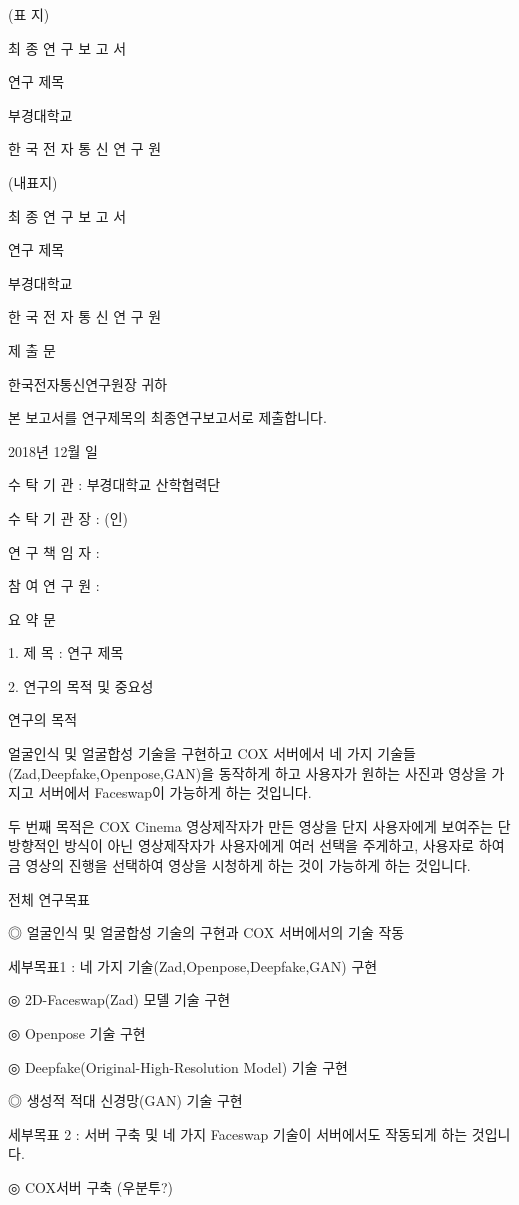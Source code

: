 \documentclass{oblivoir}
\begin{document}
(표  지)

최 종 연 구 보 고 서

연구 제목

부경대학교

한 국 전 자 통 신 연 구 원

(내표지)

최 종 연 구 보 고 서

연구 제목

부경대학교

한 국 전 자 통 신 연 구 원

제     출     문

한국전자통신연구원장  귀하

본 보고서를 연구제목의 최종연구보고서로 제출합니다. 

2018년 12월 일

수  탁  기  관 :  부경대학교 산학협력단

수 탁 기 관 장 :           (인)

연 구 책 임 자 :  

참 여 연 구 원 :  

  요     약     문

1. 제   목 : 연구 제목 

2. 연구의 목적 및 중요성

 연구의 목적

 얼굴인식 및 얼굴합성 기술을 구현하고 COX 서버에서 네 가지 기술들(Zad,Deepfake,Openpose,GAN)을 동작하게 하고 사용자가 원하는 사진과 영상을 가지고 서버에서 Faceswap이 가능하게 하는 것입니다. 

두 번째 목적은 COX Cinema 영상제작자가 만든 영상을 단지 사용자에게 보여주는 단방향적인 방식이 아닌 영상제작자가 사용자에게 여러 선택을 주게하고, 사용자로 하여금 영상의 진행을 선택하여 영상을 시청하게 하는 것이 가능하게 하는 것입니다. 

전체 연구목표

◎ 얼굴인식 및 얼굴합성 기술의 구현과 COX 서버에서의 기술 작동

 세부목표1 : 네 가지 기술(Zad,Openpose,Deepfake,GAN) 구현

◎ 2D-Faceswap(Zad) 모델 기술 구현

◎ Openpose 기술 구현

◎ Deepfake(Original-High-Resolution Model) 기술 구현 

◎ 생성적 적대 신경망(GAN) 기술 구현 

 세부목표 2 : 서버 구축 및 네 가지 Faceswap 기술이 서버에서도 작동되게 하는 것입니다.

◎ COX서버 구축 (우분투?)
\end{document}
